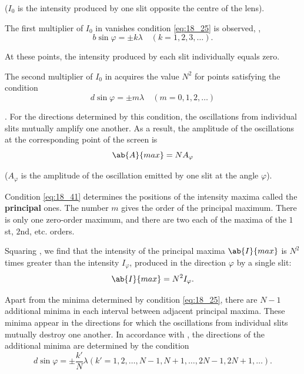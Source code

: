 \noindent
($I_0$ is the intensity produced by one slit opposite the centre of the lens).

The first multiplier of $I_0$ in  vanishes condition \eqref{eq:18_25} is observed, \ie,
\begin{equation*}
	b \sin\varphi = \pm k \lambda \quad (k = 1, 2, 3, \ldots).
\end{equation*}

At these points, the intensity produced by each slit individually equals zero.

The second multiplier of $I_0$ in  acquires the value $N^2$ for points satisfying the condition
\begin{equation}\label{eq:18_41}
	d \sin\varphi = \pm m \lambda \quad (m = 0, 1, 2, \ldots)
\end{equation}

.
For the directions determined by this condition, the oscillations from individual slits mutually amplify one another.
As a result, the amplitude of the oscillations at the corresponding point of the screen is
\begin{equation}\label{eq:18_42}
	\ab{A}{max} = N A_{\varphi}
\end{equation}

\noindent
($A_{\varphi}$ is the amplitude of the oscillation emitted by one slit at the angle $\varphi$).

Condition \eqref{eq:18_41} determines the positions of the intensity maxima called the \textbf{principal} ones.
The number $m$ gives the order of the principal maximum.
There is only one zero-order maximum, and there are two each of the maxima of the $1$st, $2$nd, etc. orders.

Squaring , we find that the intensity of the principal maxima $\ab{I}{max}$ is $N^2$ times greater than the intensity $I_{\varphi}$, produced in the direction $\varphi$ by a single slit:
\begin{equation}\label{eq:18_43}
	\ab{I}{max} = N^2 I_{\varphi}.
\end{equation}

Apart from the minima determined by condition \eqref{eq:18_25}, there are $N-1$ additional minima in each interval between adjacent principal maxima.
These minima appear in the directions for which the oscillations from individual slits mutually destroy one another.
In accordance with , the directions of the additional minima are determined by the condition
\begin{equation}\label{eq:18_44}
	d \sin\varphi = \pm \frac{k'}{N} \lambda (k'=1,2,\ldots,N-1,N+1,\ldots,2N-1,2N+1,\ldots).
\end{equation}

